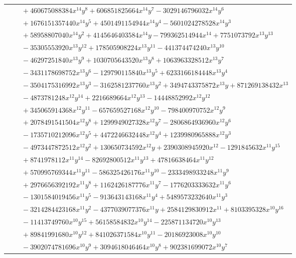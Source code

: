 \documentclass[11pt]{article}
\begin{document}
\begin{longtable}{@{}ll@{}}
 & $\quad +460675088384x^{14}y^{8}+606851825664x^{14}y^{7}-3029146796032x^{14}y^{6}$\\
 & $\quad +1676151357440x^{14}y^{5}+4501491154944x^{14}y^{4}-5601024278528x^{14}y^{3}$\\
 & $\quad +58958807040x^{14}y^{2}+4145646403584x^{14}y-799362514944x^{14}+7751073792x^{13}y^{13}$\\
 & $\quad -35305553920x^{13}y^{12}+178505908224x^{13}y^{11}-441374474240x^{13}y^{10}$\\
 & $\quad -46297251840x^{13}y^{9}+1030705643520x^{13}y^{8}+1063963328512x^{13}y^{7}$\\
 & $\quad -3431178698752x^{13}y^{6}-129790115840x^{13}y^{5}+6233166184448x^{13}y^{4}$\\
 & $\quad -3504175316992x^{13}y^{3}-3162581237760x^{13}y^{2}+3494743375872x^{13}y+871269138432x^{13}$\\
 & $\quad -4873781248x^{12}y^{14}+2216689664x^{12}y^{13}-14448852992x^{12}y^{12}$\\
 & $\quad +345065914368x^{12}y^{11}-657659527168x^{12}y^{10}-798400970752x^{12}y^{9}$\\
 & $\quad +2078491541504x^{12}y^{8}+1299949027328x^{12}y^{7}-2806864936960x^{12}y^{6}$\\
 & $\quad -1735710212096x^{12}y^{5}+4472246632448x^{12}y^{4}+1239980965888x^{12}y^{3}$\\
 & $\quad -4973447872512x^{12}y^{2}+130650734592x^{12}y+2390308945920x^{12}-1291845632x^{11}y^{15}$\\
 & $\quad +8741978112x^{11}y^{14}-82692800512x^{11}y^{13}+47816638464x^{11}y^{12}$\\
 & $\quad +570995769344x^{11}y^{11}-586325426176x^{11}y^{10}-2333498933248x^{11}y^{9}$\\
 & $\quad +2976656392192x^{11}y^{8}+1162426187776x^{11}y^{7}-1776203333632x^{11}y^{6}$\\
 & $\quad -1301584019456x^{11}y^{5}-913643143168x^{11}y^{4}+5489573232640x^{11}y^{3}$\\
 & $\quad -3214284423168x^{11}y^{2}-4377039077376x^{11}y+2584129830912x^{11}+8103395328x^{10}y^{16}$\\
 & $\quad -11413749760x^{10}y^{15}+56158584832x^{10}y^{14}-225871134720x^{10}y^{13}$\\
 & $\quad +89841991680x^{10}y^{12}+841026371584x^{10}y^{11}-20186923008x^{10}y^{10}$\\
 & $\quad -3902074781696x^{10}y^{9}+3094618046464x^{10}y^{8}+902381699072x^{10}y^{7}$\\

\end{longtable}
\end{document}
